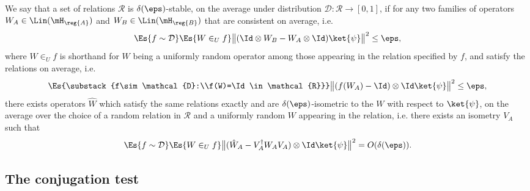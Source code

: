 \begin{definition}
We say that a set of relations $\mathcal{R}$ is $\delta(\eps)$-stable, on the average under distribution $\mathcal{D}:\mathcal{R}\to[0,1]$, if for any two families of operators $W_A\in\Lin(\mH_\reg{A})$ and  $W_B\in\Lin(\mH_\reg{B})$ that are consistent on average, i.e. 
$$\Es{f \sim\mathcal{D}} \Es{W \in_U f} \big\| (\Id\otimes W_B - W_A \otimes \Id)\ket{\psi}\big\|^2\leq \eps,$$
where $W \in_U f$ is shorthand for $W$ being a uniformly random operator among those appearing in the relation specified by $f$,
and satisfy the relations on average, i.e. 
$$\Es{\substack{f\sim\mathcal{D}:\\f(W)=\Id \in\mathcal{R}}} \big\|  (f(W_A)- \Id) \otimes \Id \ket{\psi}\big\|^2 \leq \eps,$$
  there exists operators $\hat{W}$ which satisfy the same relations exactly and are $\delta(\eps)$-isometric to the $W$ with respect to $\ket{\psi}$, on the average over the choice of a random relation in $\mathcal{R}$ and a uniformly random $W$ appearing in the relation, i.e. there exists an isometry $V_A$ such that 
  \begin{equation}
    \Es{f \sim\mathcal{D}} \Es{W \in_U f} \big\|( \hat{W}_A-V_A^\dagger W_AV_A)\otimes \Id \ket{\psi}\big\|^2=O(\delta(\eps)).\nonumber
  \end{equation}
	\end{definition}


\subsection{The conjugation test}
\label{sec:conj-test}

